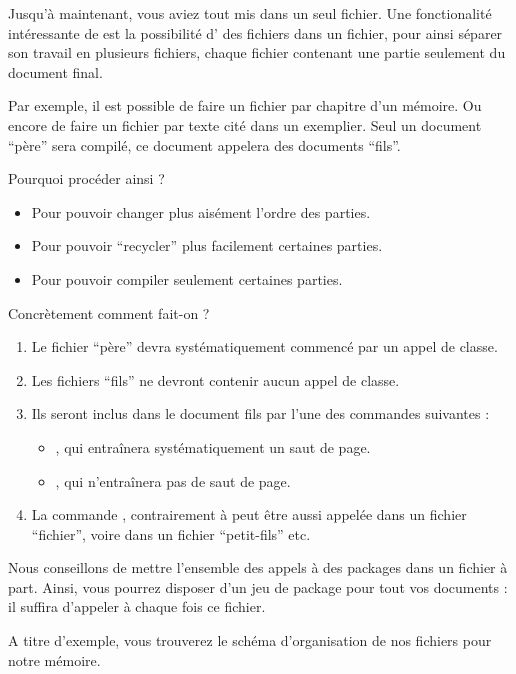 Jusqu'à maintenant, vous aviez tout mis dans un seul fichier. Une fonctionalité intéressante de \logiciel{\LaTeX} est la possibilité d' des fichiers dans un fichier, pour ainsi séparer son travail en plusieurs fichiers, chaque fichier contenant une partie seulement du document final.

Par exemple, il est possible de faire un fichier par chapitre d'un mémoire. Ou encore de faire un fichier par texte cité dans un exemplier. Seul un document \enquote{père} sera compilé, ce document appelera des documents \enquote{fils}.

Pourquoi procéder ainsi ?
\begin{itemize}
\item Pour pouvoir changer plus aisément l'ordre des parties. 
\item Pour pouvoir \enquote{recycler} plus facilement certaines parties.
\item Pour pouvoir compiler seulement certaines parties.
\end{itemize}

Concrètement comment fait-on ?
\begin{enumerate}
\item Le fichier \enquote{père} devra systématiquement commencé par un appel de classe.
\item Les fichiers \enquote{fils} ne devront contenir aucun appel de classe.
\item Ils seront inclus dans le document fils par l'une des commandes suivantes :
\begin{itemize}
	\item \verb||, qui entraînera systématiquement un saut de page.
	\item \verb||, qui n'entraînera pas de saut de page.
\end{itemize}
\item La commande , contrairement à  peut être aussi appelée dans un fichier \enquote{fichier}, voire dans un fichier \enquote{petit-fils} etc.

\end{enumerate}

Nous conseillons de mettre l'ensemble des appels à des packages dans un fichier à part. Ainsi, vous pourrez disposer d'un jeu de package pour tout vos documents : il suffira d'appeler à chaque fois ce fichier.

A titre d'exemple, vous trouverez le schéma d'organisation de nos fichiers pour notre mémoire.

